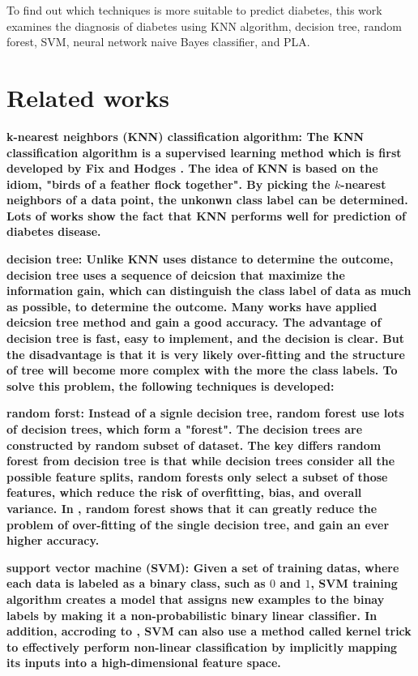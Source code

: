\documentclass[twocolumn,10pt]{article}
\begin{document}
  To find out which techniques is more suitable to predict diabetes, this work examines the diagnosis of diabetes 
  using KNN algorithm, decision tree, random forest, SVM, neural network naive Bayes classifier, and PLA.
\section{Related works}
\label{sec:Related works}

  \bf{k-nearest neighbors (KNN) classification algorithm}: \rm{The} KNN classification algorithm is a supervised learning 
  method which is first developed by Fix and Hodges \cite{10.2307/1403797}. The idea of KNN is based on the idiom, 
  "birds of a feather flock together". By picking the $k$-nearest neighbors of a data point, the unkonwn class label 
  can be determined. Lots of works \cite{6528591} \cite{8276012} \cite{vijayan2014study} show the fact that KNN performs  
  well for prediction of diabetes disease.

  \bf{decision tree}: \rm{Unlike} KNN uses distance to determine the outcome, 
  decision tree uses a sequence of deicsion that maximize the information gain, which can distinguish the class label of 
  data as much as possible, to determine the outcome. Many works \cite{5893838} \cite{8342938} have applied deicsion tree 
  method and gain a good accuracy. The advantage of decision tree is fast, easy to implement, and the decision is clear. 
  But the disadvantage is that it is very likely over-fitting and the structure of tree will become more complex with the 
  more the class labels. To solve this problem, the following techniques is developed:

  \bf{random forst}: \rm{Instead} of a signle decision tree, random forest use lots of decision trees, which form a "forest". 
  The decision trees are constructed by random subset of dataset. The key differs random forest from decision tree is that 
  while decision trees consider all the possible feature splits, random forests only select a subset of those features, which 
  reduce the risk of overfitting, bias, and overall variance. In \cite{7972337} \cite{10.1007/978-981-16-2164-2_19}, random 
  forest shows that it can greatly reduce the problem of over-fitting of the single decision tree, and gain an ever higher accuracy.

  \bf{support vector machine (SVM)}: \rm{Given} a set of training datas, where each data is labeled as a binary class, such as 
  $0$ and $1$, SVM training algorithm creates a model that assigns new examples to the binay labels by making it a non-probabilistic 
  binary linear classifier. In addition, accroding to \cite{amari1999improving} \cite{hofmann2006support}, SVM can also use a 
  method called kernel trick to effectively perform non-linear classification by implicitly mapping its inputs into a high-dimensional 
  feature space.
\end{document}
